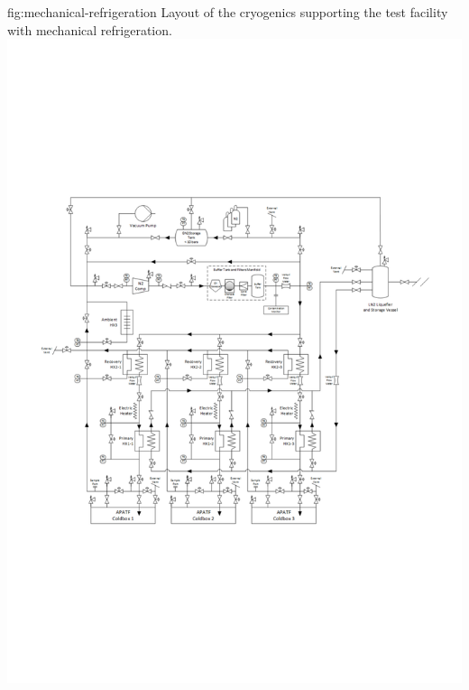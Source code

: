 \begin{dunefigure}{fig:mechanical-refrigeration}
  {Layout of the cryogenics supporting the  test facility with mechanical refrigeration.}
\includegraphics[width=.98\textwidth]{graphics/Cryo-cold-box-mechanical.pdf}
\end{dunefigure}

